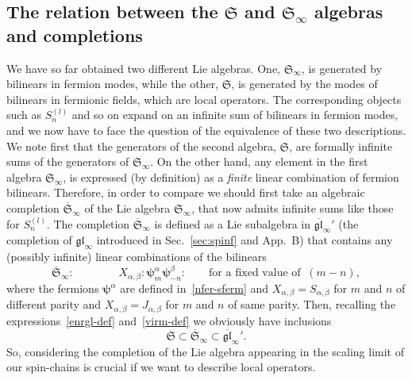 \documentclass[11pt]{article}
\newcommand{\interLie}{\mathfrak{S}}
\newcommand{\interch}{\interLie}
\newcommand{\glinf}{\gl_{\infty}}
\newcommand{\bglinf}{\overline{\gl}_{\infty}}
\newcommand{\interinfin}{\interLie_{\infty}}
\newcommand{\interinfinco}{\overline{\interLie}_{\infty}}
\newcommand{\gl}{\mathfrak{gl}}
\newcommand{\nfer}{\boldsymbol{\psi}}
\newcommand{\enrg}{S}
\newcommand{\Appglinf}{B}
\newcommand{\nord}[1]{\boldsymbol{\colon}\!\!{#1}\boldsymbol{\colon}\!\!}
\theoremstyle{definition}
\begin{document}
\subsection{The relation between the $\interch$ and $\interinfin$ algebras and completions}\label{sec:interch-interinfin}
We have so far obtained two different Lie algebras. One, $\interinfin$, is generated by bilinears in fermion modes, while the other, $\interch$, is generated by
the modes of bilinears in fermionic fields, which are local operators. The corresponding objects such as $\enrg^{(l)}_n$ and so on expand on an infinite sum of bilinears in fermion modes, and we now have to face the question of the equivalence of these two descriptions. We note first that the  generators of the second algebra, $\interch$,  are formally infinite sums of the generators of $\interinfin$. On the other hand, any element in the first algebra  $\interinfin$, is expressed (by definition) as a {\sl finite} linear combination of  fermion bilinears.  Therefore, in order to  compare we should
 first take an algebraic completion $\interinfinco$ of the Lie algebra $\interinfin$, that now admits  infinite sums like those for  $\enrg^{(l)}_n$. The completion $\interinfinco$ is defined as a Lie subalgebra in $\bglinf'$ (the completion of $\glinf$ introduced in Sec.~\ref{sec:spinf} and App.~\Appglinf)
that contains any (possibly infinite) linear combinations of the bilinears
\begin{equation}\label{interinfinco-def}
\interinfinco:\qquad\qquad X_{\alpha,\beta}\nord{\nfer^{\alpha}_m\nfer^{\beta}_{-n}}\qquad \text{for a fixed value of}\;\; (m-n),
\end{equation}
where the fermions $\nfer^{\alpha}$ are defined in~\eqref{nfer-sferm} and $X_{\alpha,\beta}=S_{\alpha,\beta}$ for $m$ and $n$ of different parity and $X_{\alpha,\beta}=J_{\alpha,\beta}$ for $m$ and $n$ of same parity.
 Then, recalling  the expressions~\eqref{enrgl-def} and~\eqref{virm-def} we obviously have inclusions
 \begin{equation*}
 \interch\subset\interinfinco\subset\bglinf'.
 \end{equation*}
 So, considering the completion of the Lie algebra appearing in the scaling limit of our spin-chains is crucial if we want to describe local operators.
\end{document}
